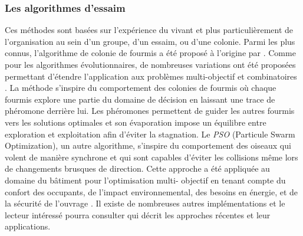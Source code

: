 \subsubsection{Les algorithmes d’essaim} %
\label{ssub:les_algorithmes_d_essaim}
Ces méthodes sont basées sur l’expérience du vivant et plus particulièrement de
l’organisation au sein d’un groupe, d’un essaim, ou d’une colonie. Parmi les plus connus,
l’algorithme de colonie de fourmis a été proposé à l’origine par \cite{Colorni1992509}.
Comme pour les algorithmes évolutionnaires, de nombreuses variations ont été proposées
permettant d’étendre l’application aux problèmes multi-objectif et combinatoires
\parencite{MichaelGuntsch2003,Shea2006627}.
La méthode s’inspire du comportement des colonies de fourmis où chaque fourmis
explore une partie du domaine de décision en laissant une trace de phéromone
derrière lui. Les phéromones permettent de guider les autres fourmis vers les
solutions optimales et son évaporation impose un équilibre entre exploration et
exploitation afin d’éviter la stagnation.
Le \textit{PSO} (Particule Swarm Optimization), un autre algorithme, s’inspire du
comportement des oiseaux qui volent de manière synchrone et qui sont capables
d’éviter les collisions même lors de changements brusques de direction. Cette
approche a été appliquée au domaine du bâtiment pour l’optimisation multi-
objectif en tenant compte du confort des occupants, de l’impact environnemental,
des besoins en énergie, et de la sécurité de l’ouvrage \parencite{Armand-Decker2015}.
Il existe de nombreuses autres implémentations et le lecteur intéressé pourra
consulter \cite{Aboul-EllaHassanien2015} qui décrit les approches récentes et
leur applications.


